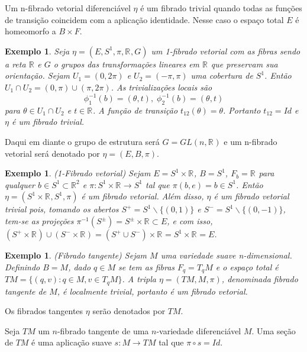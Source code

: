 \documentclass[12pt]{book}
\newtheorem{exemplo}[teorema]{Exemplo}
\newcommand{\circulo}{S^{1}}
\newcommand{\real}[1]{\mathbb{R}^{#1}}
\newcommand{\reta}{\real{}}
\begin{document}
	Um n-fibrado vetorial diferenciável $\eta$ é um fibrado trivial quando todas as funções de transição coincidem com a aplicação identidade. Nesse caso o espaço total $E$ é homeomorfo a $B\times F$.
	
	\begin{exemplo}\label{exemplo_fibrado_circulo}
		Seja $\eta=(E, \circulo,\pi, \reta, G)$ um 1-fibrado vetorial com as fibras sendo a reta $\reta$ e $G$ o grupos das transformações lineares em $\reta$ que preservam sua orientação. Sejam $U_{1} = (0,2\pi)$ e $U_{2} = (-\pi,\pi)$ uma cobertura de $\circulo$. Então $U_{1}\cap U_{2} =(0,\pi)\cup(\pi,2\pi)$. As trivializações locais são 
		$$
		\phi^{-1}_{1}(b) = (\theta, t),\; 		\phi^{-1}_{2}(b) = (\theta, t)
		$$
		para $\theta\in U_{1}\cap U_{2}$ e $t\in \reta$. A função de transição $t_{12}(\theta) = \theta$. Portanto $t_{12}=Id$ e $\eta$ é um fibrado trivial.
	\end{exemplo}
	
	Daqui em diante o grupo de estrutura será $G = GL(n,\real{})$ e um n-fibrado vetorial será denotado por $\eta = (E,B,\pi)$.
	
	\begin{exemplo}
		(1-Fibrado vetorial) Sejam $E=S^{1} \times \real{}$, $B=S^{1}$, $F_{b} = \real{}$ para qualquer $b \in S^{1}\subset \real{2}$ e $\pi:S^{1} \times \real{}\to S^{1}$ tal que $\pi(b, e)=b \in S^{1}$. Então $\eta=(S^{1} \times \real{}, S^{1}, \pi)$ é um fibrado vetorial. Além disso, $\eta$ é um fibrado vetorial trivial pois, tomando os abertos $S^{+} = S^{1} \backslash \{(0,1)\}$ e $S^{-} = S^{1} \backslash \{(0,-1)\}$, tem-se as projeções $\pi^{-1}(S^{\pm}) = S^{\pm} \times \real{} \subset E$, e com isso, $(S^{+}\times\real{}) \cup ( S^{-}\times\real{}) = (S^{+}\cup S^{-})\times\real{} = S^{1} \times\real{} =E$.
	\end{exemplo}
	
	\begin{exemplo}
		(Fibrado tangente) Sejam $M$ uma variedade suave n-dimensional. Definindo $B=M$, dado $q\in M$ se tem as fibras $F_{q} = T_{q}M$ e o espaço total é $TM=\{(q, v): q\in M, v\in T_{q}M \}$. A tripla $\eta = (TM, M, \pi)$, denominada fibrado tangente de $M$, é localmente trivial, portanto é um fibrado vetorial.
	\end{exemplo}

	Os fibrados tangentes $\eta$ serão denotados por $TM$.
 
 	Seja $TM$ um $n$-fibrado tangente de uma $n$-variedade diferenciável $M$. Uma seção de $TM$ é uma aplicação suave $s:M \to TM$ tal que $\pi\circ s=Id$.
	
\end{document}
